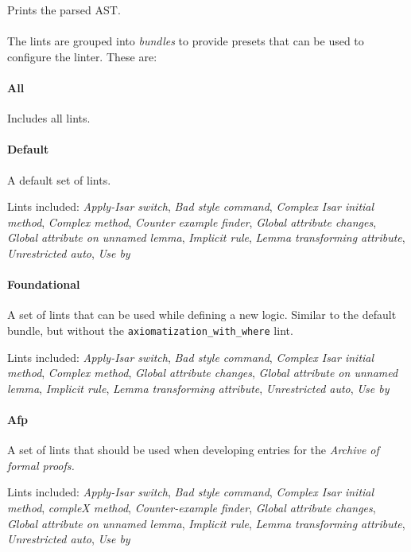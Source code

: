 Prints the parsed AST.


\paragraph{}
The lints are grouped into \textit{bundles} to provide presets that can be used to
configure the linter. These are:

\paragraph{All}
Includes all lints.
\paragraph{Default}
A default set of lints.

Lints included: \textit{Apply-Isar switch}, \textit{Bad style command}, \textit{Complex Isar initial method}, \textit{Complex method}, \textit{Counter example finder}, \textit{Global attribute changes}, \textit{Global attribute on unnamed lemma}, \textit{Implicit rule}, \textit{Lemma transforming attribute}, \textit{Unrestricted auto}, \textit{Use by}
\paragraph{Foundational}
A set of lints that can be used while defining a new logic. Similar to the default bundle,
but without the \texttt{axiomatization\_with\_where} lint.

Lints included:
 \textit{Apply-Isar switch}, \textit{Bad style command}, \textit{Complex Isar initial method}, \textit{Complex method}, \textit{Global attribute changes}, \textit{Global attribute on unnamed lemma}, \textit{Implicit rule}, \textit{Lemma transforming attribute}, \textit{Unrestricted auto}, \textit{Use by}
 
\paragraph{Afp}
A set of lints that should be used when developing entries for the \textit{Archive of
formal proofs.}

Lints included: 
\textit{Apply-Isar switch}, \textit{Bad style command}, \textit{Complex Isar initial method}, \textit{compleX method}, \textit{Counter-example finder}, \textit{Global attribute changes}, \textit{Global attribute on unnamed lemma}, \textit{Implicit rule}, \textit{Lemma transforming attribute}, \textit{Unrestricted auto}, \textit{Use by}

